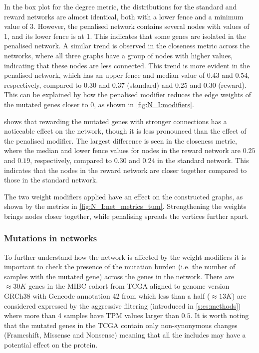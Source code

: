 In the box plot for the degree metric, the distributions for the standard and reward networks are almost identical, both with a lower fence and a minimum value of 3. However, the penalised network contains several nodes with values of 1, and its lower fence is at 1. This indicates that some genes are isolated in the penalised network. A similar trend is observed in the closeness metric across the networks, where all three graphs have a group of nodes with higher values, indicating that these nodes are less connected. This trend is more evident in the penalised network, which has an upper fence and median value of $0.43$ and $0.54$, respectively, compared to $0.30$ and $0.37$ (standard) and $0.25$ and $0.30$ (reward). This can be explained by how the penalised modifier reduces the edge weights of the mutated genes closer to 0, as shown in \cref{fig:N_I:modifiers}.

 shows that rewarding the mutated genes with stronger connections has a noticeable effect on the network, though it is less pronounced than the effect of the penalised modifier. The largest difference is seen in the closeness metric, where the median and lower fence values for nodes in the reward network are $0.25$ and $0.19$, respectively, compared to $0.30$ and $0.24$ in the standard network. This indicates that the nodes in the reward network are closer together compared to those in the standard network.

The two weight modifiers applied have an effect on the constructed graphs, as shown by the metrics in \cref{fig:N_I:net_metrics_tum}. Strengthening the weights brings nodes closer together, while penalising spreads the vertices further apart. 

\subsubsection*{Mutations in networks} \label{s:N_I:mut_rep}

To further understand how the network is affected by the weight modifiers it is important to check the presence of the mutation burden (i.e. the number of samples with the mutated gene) across the genes in the network. There are $\approx30K$ genes in the MIBC cohort from TCGA aligned to genome version GRCh38 with Gencode annotation 42 from which less than a half ($\approx13K$) are considered expressed by the aggressive filtering (introduced in \cref{s:cs:methods}) where more than 4 samples have TPM values larger than $0.5$. It is worth noting that the mutated genes in the TCGA contain only non-synonymous changes (Frameshift, Missense and Nonsense) meaning that all the includes may have a potential effect on the protein. 

